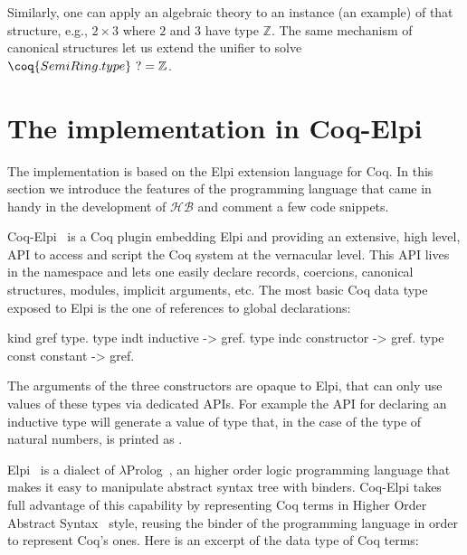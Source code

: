\documentclass[a4paper,UKenglish,cleveref, autoref]{lipics-v2019}
\newcommand{\HB}{\ensuremath{\mathcal{HB}}}
\theoremstyle{implem}
\theoremstyle{implem}
\theoremstyle{command}
\begin{document}
Similarly, one can apply an algebraic theory to an instance (an example) of that structure, e.g., \(2 \times 3\) where \(2\) and \(3\) have type \(\mathbb{Z}\).
The same mechanism of canonical structures let us extend the unifier to solve \(\coq{SemiRing.type}~? = \mathbb{Z}\).

\section{The implementation in Coq-Elpi}\label{sec:implementation}

The implementation is based on the Elpi
extension language for Coq. In this section we introduce the features of the
programming language that came in handy in the development of \HB{} and
comment a few code snippets.

Coq-Elpi~\cite{CoqElpi} is a Coq plugin embedding
Elpi and providing an
extensive, high level, API to access and script the Coq system at the
vernacular level.
This API lives in the  namespace and lets one easily declare
records, coercions, canonical structures, modules, implicit arguments, etc.
The most basic Coq data type exposed to Elpi is the one of references to global
declarations:

\begin{elpicode}
kind gref  type.                 %
type indt  inductive -> gref.    %
type indc  constructor -> gref.  %
type const constant -> gref.     %
\end{elpicode}

The arguments of the three constructors are opaque to Elpi, that can only use
values of these types via dedicated APIs. For example the API for declaring
an inductive type will generate a value of type  that,
in the case of the type of natural numbers, is printed as .

Elpi~\cite{DBLP:conf/lpar/DunchevGCT15} is a dialect
of $\lambda$Prolog~\cite{Miller:2012:PHL:2331097}, an higher order
logic programming language that makes it easy to manipulate abstract syntax
tree with binders. Coq-Elpi takes full advantage of this capability by
representing Coq terms in Higher Order Abstract
Syntax~\cite{10.1145/53990.54010} style, reusing the binder of the programming
language in order to represent Coq's ones. Here is an excerpt of the data
type of Coq terms:
\end{document}
